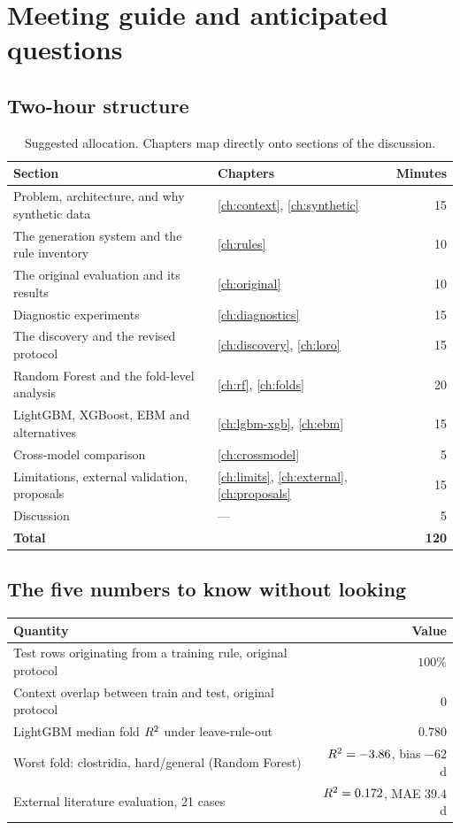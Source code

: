 \chapter{Meeting guide and anticipated questions}
\label{ch:meeting}

\section{Two-hour structure}

\begin{table}[htbp]\centering\small
\caption{Suggested allocation. Chapters map directly onto sections of the
discussion.}
\label{tab:agenda}
\begin{tabular}{p{6.6cm}p{3.4cm}r}
\toprule
Section & Chapters & Minutes \\
\midrule
Problem, architecture, and why synthetic data & \ref{ch:context}, \ref{ch:synthetic} & 15 \\
The generation system and the rule inventory & \ref{ch:rules} & 10 \\
The original evaluation and its results & \ref{ch:original} & 10 \\
Diagnostic experiments & \ref{ch:diagnostics} & 15 \\
The discovery and the revised protocol & \ref{ch:discovery}, \ref{ch:loro} & 15 \\
Random Forest and the fold-level analysis & \ref{ch:rf}, \ref{ch:folds} & 20 \\
LightGBM, XGBoost, EBM and alternatives & \ref{ch:lgbm-xgb}, \ref{ch:ebm} & 15 \\
Cross-model comparison & \ref{ch:crossmodel} & 5 \\
Limitations, external validation, proposals & \ref{ch:limits}, \ref{ch:external}, \ref{ch:proposals} & 15 \\
Discussion & --- & 5 \\
\midrule
\textbf{Total} & & \textbf{120} \\
\bottomrule
\end{tabular}
\end{table}

\section{The five numbers to know without looking}

\begin{center}\small
\begin{tabular}{p{7.4cm}r}
\toprule
Quantity & Value \\
\midrule
Test rows originating from a training rule, original protocol & $100\%$ \\
Context overlap between train and test, original protocol & $0$ \\
LightGBM median fold $R^2$ under leave-rule-out & $0.780$ \\
Worst fold: clostridia, hard/general (Random Forest) & $R^2 = -3.86$, bias $-62$ d \\
External literature evaluation, 21 cases & $R^2 = 0.172$, MAE $39.4$ d \\
\bottomrule
\end{tabular}
\end{center}

